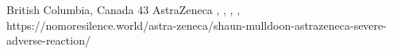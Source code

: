           {British Columbia, Canada}
          {43}
          {AstraZeneca}
          {}
          {
            ,
            ,
            ,
            ,
          }
          {https://nomoresilence.world/astra-zeneca/shaun-mulldoon-astrazeneca-severe-adverse-reaction/}

